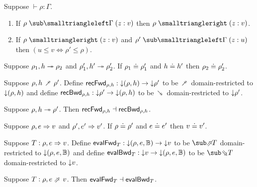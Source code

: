 \begin{lemma}
\label{lem:core-language:env-get-put}Suppose $\vdash \rho: \Gamma$.
\begin{enumerate}
   \item \label{lem:core-language:env-get-put:1} If $\envLookupBwd{\rho}{\Gamma}{\bind{z}{v}}$ then $\envLookup{\rho}{z}{v}$.
   \item \label{lem:core-language:env-get-put:2} If $\envLookup{\rho}{z}{v}$ and $\envLookupBwd{\rho'}{\Gamma}{\bind{z}{u}}$ then $(u \leq v \iff \rho' \leq \rho)$.
\end{enumerate}
\end{lemma}

\begin{lemma}
    Suppose $\rho_1, h \mathrel{\twoheadrightarrow} \rho_2$ and $\rho_1', h' \mathrel{\twoheadrightarrow} \rho_2'$. If $\rho_1 \doteq \rho_1'$ and $h \doteq h'$ then $\rho_2 \doteq \rho_2'$.
\end{lemma}

\begin{definition}
   Suppose $\rho, h \closeDefsFwdR \rho'$. Define $\mathsf{recFwd}_{\rho,h}: {\downarrow}{(\rho, h)} \to {\downarrow}{\rho'}$ to be $\closeDefsFwdR$ domain-restricted to ${\downarrow}{(\rho, h)}$ and define $\mathsf{recBwd}_{\rho,h}: {\downarrow}{\rho'} \to {\downarrow}{(\rho, h)}$ to be $\closeDefsBwdR$ domain-restricted to ${\downarrow}{\rho'}$.
\end{definition}

\begin{theorem}
\label{thm:core-language:closeDefs:gc}
   Suppose $\rho, h \mathrel{\twoheadrightarrow} \rho'$.  Then $\mathsf{recFwd}_{\rho,h} \dashv \mathsf{recBwd}_{\rho,h}$.
\end{theorem}

\begin{lemma}
   Suppose $\rho, e \mathrel{\Rightarrow} v$ and $\rho', e' \mathrel{\Rightarrow} v'$. If $\rho \doteq \rho'$ and $e \doteq e'$ then $v \doteq v'$.
\end{lemma}

\begin{definition}
   Suppose $T: \rho, e \mathrel{\Rightarrow} v$. Define $\mathsf{evalFwd}_{T}: {\downarrow}{(\rho, e, \mathbb{B})} \to {\downarrow}{v}$ to be $\evalFwdR{T}$ domain-restricted to ${\downarrow}{(\rho, e, \mathbb{B})}$ and define $\mathsf{evalBwd}_{T}: {\downarrow}{v} \to {\downarrow}{(\rho, e, \mathbb{B})}$ to be $\evalBwdR{T}$ domain-restricted to ${\downarrow}{v}$.
\end{definition}

\begin{theorem}
\label{thm:core-language:eval:gc}
   Suppose $T: \rho, e \evalFwdS v$.  Then $\mathsf{evalFwd}_{T} \dashv \mathsf{evalBwd}_{T}$.
\end{theorem}
